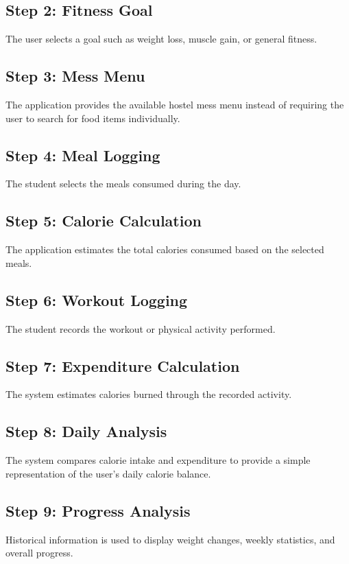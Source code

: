\documentclass[11pt,a4paper]{article}
\begin{document}
\subsection*{Step 2: Fitness Goal}
The user selects a goal such as weight loss, muscle gain, or general fitness.

\subsection*{Step 3: Mess Menu}
The application provides the available hostel mess menu instead of requiring the user to search for food items individually.

\subsection*{Step 4: Meal Logging}
The student selects the meals consumed during the day.

\subsection*{Step 5: Calorie Calculation}
The application estimates the total calories consumed based on the selected meals.

\subsection*{Step 6: Workout Logging}
The student records the workout or physical activity performed.

\subsection*{Step 7: Expenditure Calculation}
The system estimates calories burned through the recorded activity.

\subsection*{Step 8: Daily Analysis}
The system compares calorie intake and expenditure to provide a simple representation of the user's daily calorie balance.

\subsection*{Step 9: Progress Analysis}
Historical information is used to display weight changes, weekly statistics, and overall progress.
\end{document}
